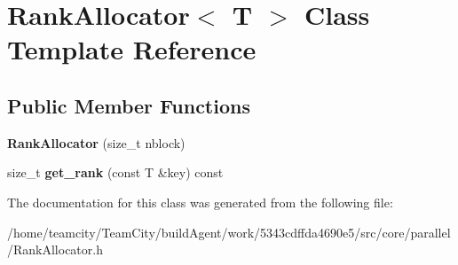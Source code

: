 \hypertarget{classRankAllocator}{}\section{Rank\+Allocator$<$ T $>$ Class Template Reference}
\label{classRankAllocator}
\subsection*{Public Member Functions}
\begin{DoxyCompactItemize}
\item 
{\bfseries Rank\+Allocator} (size\+\_\+t nblock)\hypertarget{classRankAllocator_a67514fc71df1af7ce6685bb29c0d14ad}{}\label{classRankAllocator_a67514fc71df1af7ce6685bb29c0d14ad}

\item 
size\+\_\+t {\bfseries get\+\_\+rank} (const T \&key) const \hypertarget{classRankAllocator_abc5889aff731c7eaba2f5f7f0fc4e7ec}{}\label{classRankAllocator_abc5889aff731c7eaba2f5f7f0fc4e7ec}

\end{DoxyCompactItemize}


The documentation for this class was generated from the following file\+:\begin{DoxyCompactItemize}
\item 
/home/teamcity/\+Team\+City/build\+Agent/work/5343cdffda4690e5/src/core/parallel/Rank\+Allocator.\+h\end{DoxyCompactItemize}
